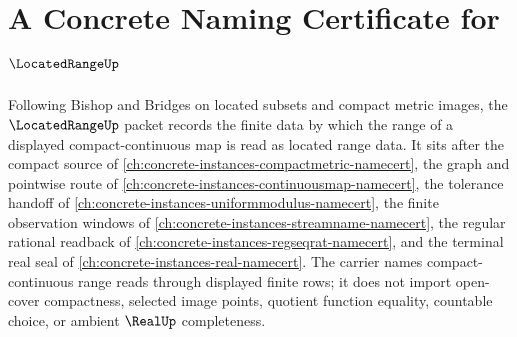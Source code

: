 \chapter{A Concrete Naming Certificate for $\LocatedRangeUp$}
\label{ch:concrete-instances-located-range-namecert}

Following Bishop and Bridges on located subsets and compact metric images, the $\LocatedRangeUp$ packet records the finite data by which the range of a displayed compact-continuous map is read as located range data. It sits after the compact source of \autoref{ch:concrete-instances-compactmetric-namecert}, the graph and pointwise route of \autoref{ch:concrete-instances-continuousmap-namecert}, the tolerance handoff of \autoref{ch:concrete-instances-uniformmodulus-namecert}, the finite observation windows of \autoref{ch:concrete-instances-streamname-namecert}, the regular rational readback of \autoref{ch:concrete-instances-regseqrat-namecert}, and the terminal real seal of \autoref{ch:concrete-instances-real-namecert}. The carrier names compact-continuous range reads through displayed finite rows; it does not import open-cover compactness, selected image points, quotient function equality, countable choice, or ambient $\RealUp$ completeness.


